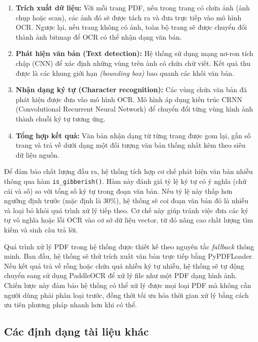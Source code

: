 \begin{enumerate}
    \item \textbf{Trích xuất dữ liệu:} Với mỗi trang PDF, nếu trong trang có chứa ảnh (ảnh chụp hoặc scan), các ảnh đó sẽ được tách ra và đưa trực tiếp vào mô hình OCR. Ngược lại, nếu trang không có ảnh, toàn bộ trang sẽ được chuyển đổi thành ảnh bitmap để OCR có thể nhận dạng văn bản.

    \item \textbf{Phát hiện văn bản (Text detection):} Hệ thống sử dụng mạng nơ-ron tích chập (CNN) để xác định những vùng trên ảnh có chứa chữ viết. Kết quả thu được là các khung giới hạn \emph{(bounding box)} bao quanh các khối văn bản.

    \item \textbf{Nhận dạng ký tự (Character recognition):} Các vùng chứa văn bản đã phát hiện được đưa vào mô hình OCR. Mô hình áp dụng kiến trúc CRNN (Convolutional Recurrent Neural Network) để chuyển đổi từng vùng hình ảnh thành chuỗi ký tự tương ứng.

    \item \textbf{Tổng hợp kết quả:} Văn bản nhận dạng từ từng trang được gom lại, gắn số trang và trả về dưới dạng một đối tượng văn bản thống nhất kèm theo siêu dữ liệu nguồn.
\end{enumerate}

Để đảm bảo chất lượng đầu ra, hệ thống tích hợp cơ chế phát hiện văn bản nhiễu thông qua hàm \texttt{is\_gibberish()}. Hàm này đánh giá tỷ lệ ký tự có ý nghĩa (chữ cái và số) so với tổng số ký tự trong đoạn văn bản. Nếu tỷ lệ này thấp hơn ngưỡng định trước (mặc định là 30\%), hệ thống sẽ coi đoạn văn bản đó là nhiễu và loại bỏ khỏi quá trình xử lý tiếp theo. Cơ chế này giúp tránh việc đưa các ký tự vô nghĩa hoặc lỗi OCR vào cơ sở dữ liệu vector, từ đó nâng cao chất lượng tìm kiếm và sinh câu trả lời.

Quá trình xử lý PDF trong hệ thống được thiết kế theo nguyên tắc \emph{fallback} thông minh. Ban đầu, hệ thống sẽ thử trích xuất văn bản trực tiếp bằng PyPDFLoader. Nếu kết quả trả về rỗng hoặc chứa quá nhiều ký tự nhiễu, hệ thống sẽ tự động chuyển sang sử dụng PaddleOCR để xử lý file như một PDF dạng hình ảnh. Chiến lược này đảm bảo hệ thống có thể xử lý được mọi loại PDF mà không cần người dùng phải phân loại trước, đồng thời tối ưu hóa thời gian xử lý bằng cách ưu tiên phương pháp nhanh hơn khi có thể.

\subsection{Các định dạng tài liệu khác}

